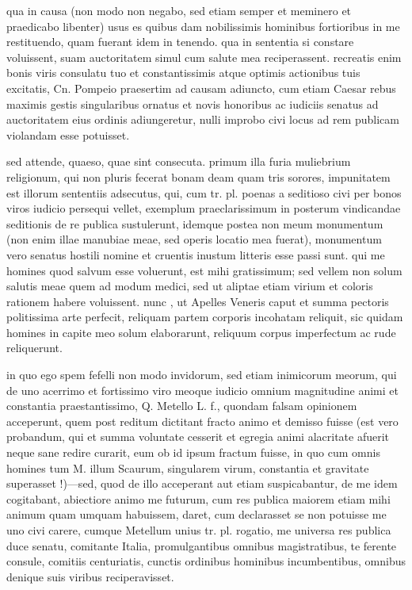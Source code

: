  qua in causa (non modo non negabo, sed etiam semper et meminero et praedicabo libenter) usus es quibus dam nobilissimis hominibus fortioribus in me restituendo, quam fuerant idem in tenendo. qua in sententia si constare voluissent, suam auctoritatem simul cum salute mea reciperassent. recreatis enim bonis viris consulatu tuo et constantissimis atque optimis actionibus tuis excitatis, Cn. Pompeio praesertim ad causam adiuncto, cum etiam Caesar rebus maximis gestis singularibus ornatus et novis honoribus ac iudiciis senatus ad auctoritatem eius ordinis adiungeretur, nulli improbo civi locus ad rem publicam violandam esse potuisset.

 sed attende, quaeso, quae sint consecuta. primum illa furia muliebrium religionum, qui non pluris fecerat bonam deam quam tris sorores, impunitatem est illorum sententiis adsecutus, qui, cum tr. pl. poenas a seditioso civi per bonos viros iudicio persequi vellet, exemplum praeclarissimum in posterum vindicandae seditionis de re publica sustulerunt, idemque postea non meum monumentum (non enim illae manubiae meae, sed operis locatio mea fuerat), monumentum vero senatus hostili nomine et cruentis inustum litteris esse passi sunt. qui me homines quod salvum esse voluerunt, est mihi gratissimum; sed vellem non solum salutis meae quem ad modum medici, sed ut aliptae etiam virium et coloris rationem habere voluissent. nunc , ut Apelles Veneris caput et summa pectoris politissima arte perfecit, reliquam partem corporis incohatam reliquit, sic quidam homines in capite meo solum elaborarunt, reliquum corpus imperfectum ac rude reliquerunt.

 in quo ego spem fefelli non modo invidorum, sed etiam inimicorum meorum, qui de uno acerrimo et fortissimo viro meoque iudicio omnium magnitudine animi et constantia praestantissimo, Q. Metello L. f., quondam falsam opinionem acceperunt, quem post reditum dictitant fracto animo et demisso fuisse (est vero probandum, qui et summa voluntate cesserit et egregia animi alacritate afuerit neque sane redire curarit, eum ob id ipsum fractum fuisse, in quo cum omnis homines tum M. illum Scaurum, singularem virum, constantia et gravitate superasset !)—sed, quod de illo acceperant aut etiam suspicabantur, de me idem cogitabant, abiectiore animo me futurum, cum res publica maiorem etiam mihi animum quam umquam habuissem, daret, cum declarasset se non potuisse me uno civi carere, cumque Metellum unius tr. pl. rogatio, me universa res publica duce senatu, comitante Italia, promulgantibus omnibus magistratibus, te ferente consule, comitiis centuriatis, cunctis ordinibus hominibus incumbentibus, omnibus denique suis viribus reciperavisset.

